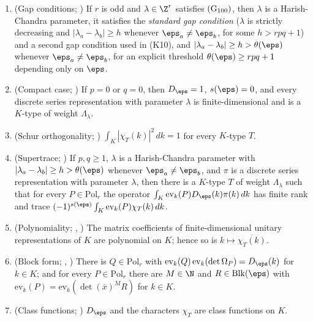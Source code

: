 \begin{enumerate}[label=(K\arabic*)]
\item (Gap conditions; ) If $r$ is odd and $\lambda\in\Z^r$
satisfies $\textup{(G$_{100}$)}$, then $\lambda$ is a Harish-Chandra parameter, it satisfies the \emph{standard gap
condition} ($\lambda$ is strictly decreasing and $|\lambda_a-\lambda_b|\ge h$ whenever $\eps_a\ne\eps_b$, for some
$h>rpq+1$) and a second gap condition used in (K10), and $|\lambda_a-\lambda_b|\ge h>\theta(\eps)$ whenever
$\eps_a\ne\eps_b$, for an explicit threshold $\theta(\eps)\ge rpq+1$ depending only on $\eps$.
\item (Compact case; ) If $p=0$ or $q=0$, then $D_\eps=1$,
$s(\eps)=0$, and every discrete series representation with parameter $\lambda$ is finite-dimensional and is a $K$-type of
weight $\Lambda_\lambda$.
\item (Schur orthogonality; )
$\int_K|\chi_T(k)|^2\,dk=1$ for every $K$-type $T$.
\item (Supertrace; ) If $p,q\ge1$, $\lambda$ is a
Harish-Chandra parameter with $|\lambda_a-\lambda_b|\ge h>\theta(\eps)$ whenever $\eps_a\ne\eps_b$, and $\pi$ is a
discrete series representation with parameter $\lambda$, then there is a $K$-type $T$ of weight $\Lambda_\lambda$ such
that for every $P\in\mathrm{Pol}_r$ the operator $\int_K\mathrm{ev}_k(P)D_\eps(k)\pi(k)\,dk$ has finite rank and trace
$(-1)^{s(\eps)}\int_K\mathrm{ev}_k(P)\chi_T(k)\,dk$.
\item (Polynomiality; , ) The matrix
coefficients of finite-dimensional unitary representations of $K$ are polynomial on $K$; hence so is
$k\mapsto\overline{\chi_T(k)}$.
\item (Block form; ,
) There is $Q\in\mathrm{Pol}_r$ with
$\mathrm{ev}_k(Q)\,\mathrm{ev}_k(\det\Omega_P)=D_\eps(k)$ for $k\in K$; and for every $P\in\mathrm{Pol}_r$ there are
$M\in\N$ and $R\in\mathrm{Blk}(\eps)$ with $\mathrm{ev}_k(P)=\mathrm{ev}_k(\det(\bar x)^MR)$ for $k\in K$.
\item (Class functions; ) $D_\eps$ and the characters
$\chi_T$ are class functions on $K$.

\end{enumerate}
